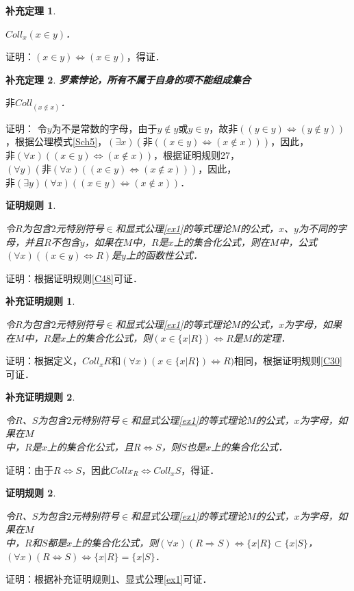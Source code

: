 \documentclass[12pt, a4paper, oneside]{book}
\newtheorem{C}{证明规则}
\newtheorem{Ccor}{补充证明规则}
\newtheorem{cor}{补充定理}
\begin{document}
			\begin{cor}\label{cor3}
				\hfill\par
				$Coll_x(x\in y)$．
			\end{cor}
			证明：$(x\in y)\Leftrightarrow (x\in y)$，得证．

			\begin{cor}\label{cor4}
				\textbf{罗素悖论，所有不属于自身的项不能组成集合}
				\par
				$\text{非}Coll_(x\notin x)$．
			\end{cor}
			证明：
			令$y$为不是常数的字母，由于$y\notin y\text{或}y\in y$，故$\text{非}((y\in y)\Leftrightarrow (y\notin y))$，根据公理模式\ref{Sch5}，$(\exists x)(\text{非}((x\in y)\Leftrightarrow (x\notin x)))$，因此，$\text{非}(\forall x)((x\in y)\Leftrightarrow (x\notin x))$，根据证明规则27，$(\forall y)(\text{非}(\forall x)((x\in y)\Leftrightarrow (x\notin x)))$，因此，$\text{非}(\exists y)(\forall x)((x\in y)\Leftrightarrow (x\notin x))$．

			\begin{C}\label{C49}
				\hfill\par
				令$R$为包含$2$元特别符号$\in$和显式公理\ref{ex1}的等式理论$M$的公式，$x$、$y$为不同的字母，并且$R$不包含$y$，如果在$M$中，$R$是$x$上的集合化公式，则在$M$中，公式$(\forall x)((x\in y)\Leftrightarrow R)$是$y$上的函数性公式．
			\end{C}
			证明：根据证明规则\ref{C48}可证．

			\begin{Ccor}\label{Ccor11}
				\hfill\par
				令$R$为包含$2$元特别符号$\in$和显式公理\ref{ex1}的等式理论$M$的公式，$x$为字母，如果在$M$中，$R$是$x$上的集合化公式，则$(x\in \{x|R\})\Leftrightarrow R$是$M$的定理．
			\end{Ccor}
			证明：根据定义，$Coll_xR$和$(\forall x)(x\in \{x|R\})\Leftrightarrow R)$相同，根据证明规则\ref{C30}可证．

			\begin{Ccor}\label{Ccor12}
				\hfill\par
				令$R$、$S$为包含$2$元特别符号$\in$和显式公理\ref{ex1}的等式理论$M$的公式，$x$为字母，如果在$M$\\中，$R$是$x$上的集合化公式，且$R\Leftrightarrow S$，则$S$也是$x$上的集合化公式．
			\end{Ccor}
			证明：由于$R\Leftrightarrow S$，因此$Collx_R\Leftrightarrow Coll_xS$，得证．

			\begin{C}\label{C50}
				\hfill\par
				令$R$、$S$为包含$2$元特别符号$\in$和显式公理\ref{ex1}的等式理论$M$的公式，$x$为字母，如果在$M$\\中，$R$和$S$都是$x$上的集合化公式，则$(\forall x)(R\Rightarrow S)\Leftrightarrow \{x|R\}\subset \{x|S\}$，$(\forall x)(R\Leftrightarrow S)\Leftrightarrow \{x|R\}=\{x|S\}$．
			\end{C}
			证明：根据补充证明规则\ref{Ccor11}、显式公理\ref{ex1}可证．
\end{document}
